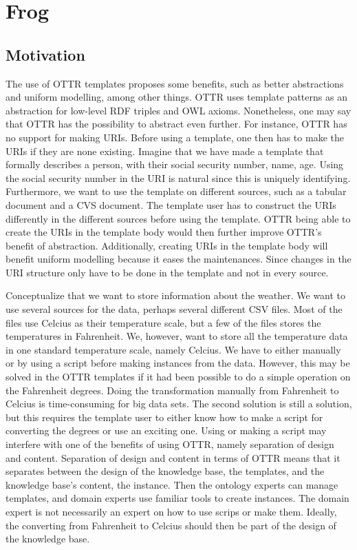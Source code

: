 \section{Frog}

\subsection{Motivation}
The use of OTTR templates proposes some benefits, such as better abstractions and uniform modelling, among other things. OTTR uses template patterns as an abstraction for low-level RDF triples and OWL axioms. Nonetheless, one may say that OTTR has the possibility to abstract even further. For instance, OTTR has no support for making URIs. Before using a template, one then has to make the URIs if they are none existing. Imagine that we have made a template that formally describes a person, with their social security number, name, age. Using the social security number in the URI is natural since this is uniquely identifying. Furthermore, we want to use the template on different sources, such as a tabular document and a CVS document. The template user has to construct the URIs differently in the different sources before using the template. OTTR being able to create the URIs in the template body would then further improve OTTR's benefit of abstraction. Additionally, creating URIs in the template body will benefit uniform modelling because it eases the maintenances. Since changes in the URI structure only have to be done in the template and not in every source.

\para
Conceptualize that we want to store information about the weather. We want to use several sources for the data, perhaps several different CSV files. Most of the files use Celcius as their temperature scale, but a few of the files stores the temperatures in Fahrenheit. We, however, want to store all the temperature data in one standard temperature scale, namely Celcius. We have to either manually or by using a script before making instances from the data. However, this may be solved in the OTTR templates if it had been possible to do a simple operation on the Fahrenheit degrees. Doing the transformation manually from Fahrenheit to Celcius is time-consuming for big data sets. The second solution is still a solution, but this requires the template user to either know how to make a script for converting the degrees or use an exciting one. Using or making a script may interfere with one of the benefits of using OTTR, namely separation of design and content. Separation of design and content in terms of OTTR means that it separates between the design of the knowledge base, the templates, and the knowledge base's content, the instance. Then the ontology experts can manage templates, and domain experts use familiar tools to create instances. The domain expert is not necessarily an expert on how to use scrips or make them. Ideally, the converting from Fahrenheit to Celcius should then be part of the design of the knowledge base. 

